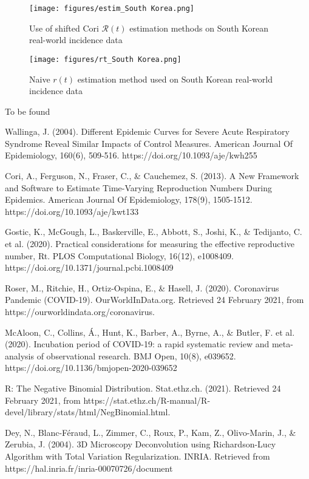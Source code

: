 \documentclass{article}
\newcommand{\nR}{\mathscr{R}}
\newcommand{\nr}{r}
\begin{document}
\begin{figure}[h!]
    \centering
    \texttt{[image: figures/estim\_South Korea.png]}
    \caption{Use of shifted Cori $\nR(t)$ estimation methods on South Korean real-world incidence data}
    \label{fig:my_label}
\end{figure}

\clearpage
\begin{figure}[h!]
    \centering
    \texttt{[image: figures/rt\_South Korea.png]}
    \caption{Naive $\nr(t)$ estimation method used on South Korean real-world incidence data}
    \label{fig:my_label}
\end{figure}


\begin{thebibliography}{2}
To be found

Wallinga, J. (2004). Different Epidemic Curves for Severe Acute Respiratory Syndrome Reveal Similar Impacts of Control Measures. American Journal Of Epidemiology, 160(6), 509-516. https://doi.org/10.1093/aje/kwh255

Cori, A., Ferguson, N., Fraser, C., \& Cauchemez, S. (2013). A New Framework and Software to Estimate Time-Varying Reproduction Numbers During Epidemics. American Journal Of Epidemiology, 178(9), 1505-1512. https://doi.org/10.1093/aje/kwt133

Gostic, K., McGough, L., Baskerville, E., Abbott, S., Joshi, K., \& Tedijanto, C. et al. (2020). Practical considerations for measuring the effective reproductive number, Rt. PLOS Computational Biology, 16(12), e1008409. https://doi.org/10.1371/journal.pcbi.1008409


Roser, M., Ritchie, H., Ortiz-Ospina, E., \& Hasell, J. (2020). Coronavirus Pandemic (COVID-19). OurWorldInData.org. Retrieved 24 February 2021, from https://ourworldindata.org/coronavirus.

McAloon, C., Collins, Á., Hunt, K., Barber, A., Byrne, A., \& Butler, F. et al. (2020). Incubation period of COVID-19: a rapid systematic review and meta-analysis of observational research. BMJ Open, 10(8), e039652. https://doi.org/10.1136/bmjopen-2020-039652


R: The Negative Binomial Distribution. Stat.ethz.ch. (2021). Retrieved 24 February 2021, from https://stat.ethz.ch/R-manual/R-devel/library/stats/html/NegBinomial.html.

Dey, N., Blanc-Féraud, L., Zimmer, C., Roux, P., Kam, Z., Olivo-Marin, J., \& Zerubia, J. (2004). 3D Microscopy Deconvolution using Richardson-Lucy Algorithm with Total Variation Regularization. INRIA. Retrieved from https://hal.inria.fr/inria-00070726/document
    


\end{thebibliography}
\end{document}
